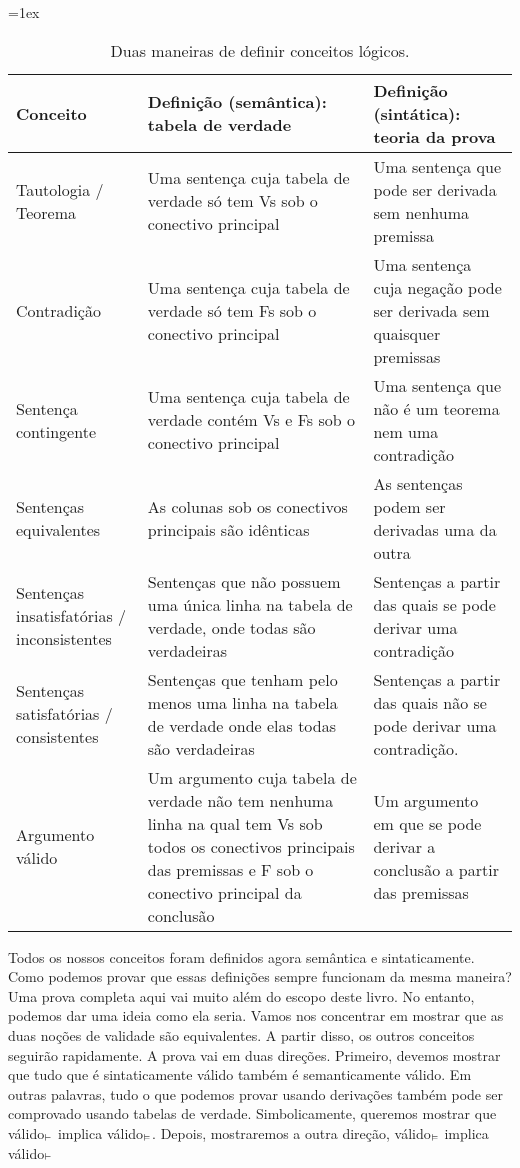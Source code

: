 \begin{sidewaystable}\small
\tabulinesep=1ex
\begin{tabu}{X[.5,c,m] ||X[1,l,m] |X[1,l,m]}
\textbf{Conceito} 		&	\textbf{Definição (semântica): tabela de verdade} 	&	\textbf{ Definição  (sintática):  teoria da prova} \\ \hline \hline

Tautologia / Teorema  &	Uma sentença cuja tabela de verdade só tem Vs sob o conectivo principal  & Uma sentença que pode ser derivada sem nenhuma premissa	 \\ \hline
 
Contradição		&	Uma sentença cuja tabela de verdade só tem Fs sob o conectivo principal  &	Uma sentença cuja negação pode ser derivada sem quaisquer premissas\\ \hline

Sentença contingente	&	Uma sentença cuja tabela de verdade contém Vs e Fs sob o  conectivo principal & Uma sentença que não é um teorema nem uma contradição \\ \hline

Sentenças equivalentes  &	As colunas sob os conectivos principais são idênticas & As sentenças podem ser derivadas uma da outra	\\ \hline

Sentenças  insatisfatórias / inconsistentes	&	Sentenças que não possuem uma única linha na tabela de verdade, onde todas são verdadeiras	& Sentenças a partir das quais se pode derivar uma contradição \\ \hline

Sentenças  satisfatórias  / consistentes	&	Sentenças que tenham pelo menos uma linha na tabela de verdade onde elas todas são verdadeiras & Sentenças  a partir das quais não se pode derivar uma contradição.	\\ \hline

Argumento válido 		&	Um argumento cuja tabela de verdade não tem  nenhuma linha  na qual  tem Vs sob todos os conectivos principais das premissas e F sob o conectivo principal da conclusão  & Um argumento em que se pode derivar a conclusão a partir das premissas	\\ 
\end{tabu}
\caption{Duas maneiras de definir conceitos lógicos.}
\label{table:truth_tables_or_derivations}
\end{sidewaystable}


Todos os nossos conceitos foram definidos agora semântica e sintaticamente. Como podemos provar que essas definições sempre funcionam da mesma maneira? Uma prova completa aqui vai muito além do escopo deste livro. No entanto, podemos dar uma ideia como ela seria. Vamos nos concentrar em mostrar que as duas noções de validade são equivalentes. A partir disso, os outros conceitos seguirão rapidamente. A  prova vai em duas direções. Primeiro, devemos mostrar que tudo que é sintaticamente válido também é semanticamente válido.  
Em outras palavras, tudo o que podemos provar usando derivações também pode ser comprovado usando tabelas de verdade. Simbolicamente,  queremos mostrar que  válido$_{\vdash}$ implica válido$_{\vDash}$. Depois, mostraremos a outra  direção, válido$_{\vDash}$ implica válido$_{\vdash}$


